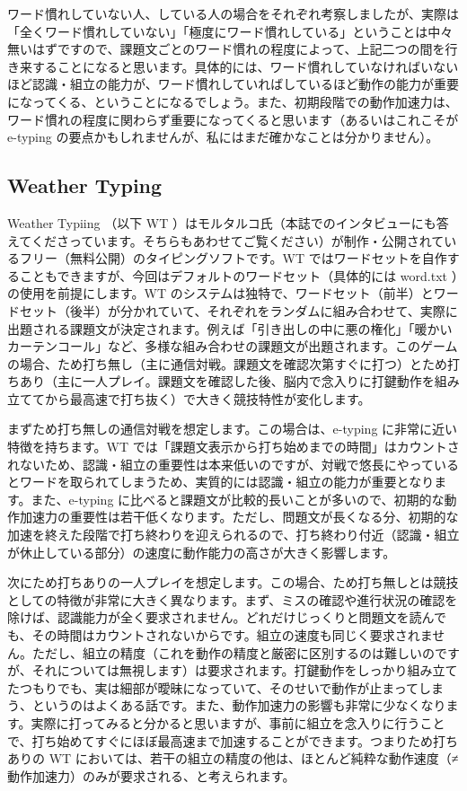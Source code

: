 ワード慣れしていない人、している人の場合をそれぞれ考察しましたが、実際は「全くワード慣れしていない」「極度にワード慣れしている」ということは中々無いはずですので、課題文ごとのワード慣れの程度によって、上記二つの間を行き来することになると思います。具体的には、ワード慣れしていなければいないほど認識・組立の能力が、ワード慣れしていればしているほど動作の能力が重要になってくる、ということになるでしょう。また、初期段階での動作加速力は、ワード慣れの程度に関わらず重要になってくると思います（あるいはこれこそが e-typing の要点かもしれませんが、私にはまだ確かなことは分かりません）。

\subsection{Weather Typing}

Weather Typiing （以下 WT ）はモルタルコ氏（本誌でのインタビューにも答えてくださっています。そちらもあわせてご覧ください）が制作・公開されているフリー（無料公開）のタイピングソフトです。WT ではワードセットを自作することもできますが、今回はデフォルトのワードセット（具体的には word.txt ）の使用を前提にします。WT のシステムは独特で、ワードセット（前半）とワードセット（後半）が分かれていて、それぞれをランダムに組み合わせて、実際に出題される課題文が決定されます。例えば「引き出しの中に悪の権化」「暖かいカーテンコール」など、多様な組み合わせの課題文が出題されます。このゲームの場合、ため打ち無し（主に通信対戦。課題文を確認次第すぐに打つ）とため打ちあり（主に一人プレイ。課題文を確認した後、脳内で念入りに打鍵動作を組み立ててから最高速で打ち抜く）で大きく競技特性が変化します。

まずため打ち無しの通信対戦を想定します。この場合は、e-typing に非常に近い特徴を持ちます。WT では「課題文表示から打ち始めまでの時間」はカウントされないため、認識・組立の重要性は本来低いのですが、対戦で悠長にやっているとワードを取られてしまうため、実質的には認識・組立の能力が重要となります。また、e-typing に比べると課題文が比較的長いことが多いので、初期的な動作加速力の重要性は若干低くなります。ただし、問題文が長くなる分、初期的な加速を終えた段階で打ち終わりを迎えられるので、打ち終わり付近（認識・組立が休止している部分）の速度に動作能力の高さが大きく影響します。

次にため打ちありの一人プレイを想定します。この場合、ため打ち無しとは競技としての特徴が非常に大きく異なります。まず、ミスの確認や進行状況の確認を除けば、認識能力が全く要求されません。どれだけじっくりと問題文を読んでも、その時間はカウントされないからです。組立の速度も同じく要求されません。ただし、組立の精度（これを動作の精度と厳密に区別するのは難しいのですが、それについては無視します）は要求されます。打鍵動作をしっかり組み立てたつもりでも、実は細部が曖昧になっていて、そのせいで動作が止まってしまう、というのはよくある話です。また、動作加速力の影響も非常に少なくなります。実際に打ってみると分かると思いますが、事前に組立を念入りに行うことで、打ち始めてすぐにほぼ最高速まで加速することができます。つまりため打ちありの WT においては、若干の組立の精度の他は、ほとんど純粋な動作速度（≠動作加速力）のみが要求される、と考えられます。

